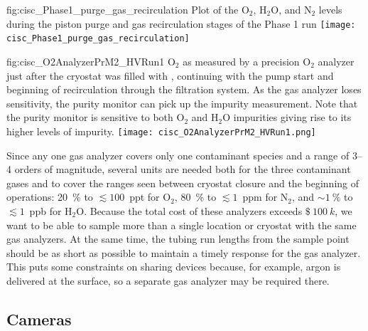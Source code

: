 \begin{dunefigure}{fig:cisc_Phase1_purge_gas_recirculation}
  {Plot of the $\text{O}_2$, $\text{H}_2\text{O}$, and $\text{N}_2$ levels during the piston purge and gas recirculation stages of the  Phase 1 run}
  \texttt{[image: cisc\_Phase1\_purge\_gas\_recirculation]}
\end{dunefigure}

\begin{dunefigure}{fig:cisc_O2AnalyzerPrM2_HVRun1}
  {$\text{O}_2$ as measured by a precision $\text{O}_2$ analyzer just after the  cryostat was filled with , continuing with the  pump start and beginning of  recirculation through the filtration system. As the gas analyzer loses sensitivity, the purity monitor can pick up the impurity measurement. Note that the purity monitor is sensitive to both $\text{O}_2$ and $\text{H}_2\text{O}$ impurities giving rise to its higher levels of impurity.}
  \texttt{[image: cisc\_O2AnalyzerPrM2\_HVRun1.png]}
\end{dunefigure}

Since any one gas analyzer covers only one contaminant species and a range of \numrange{3}{4} orders of magnitude, several units are needed both for the three contaminant gases and to cover the ranges seen between  cryostat closure and the beginning of  operations:
\SI{20}{\percent} to $\lesssim 100$~ppt for $\text{O}_2$,
\SI{80}{\percent} to $\lesssim 1$~ppm for $\text{N}_2$, and
$\sim \SI{1}{\percent}$ to $\lesssim 1$~ppb for $\text{H}_2\text{O}$.
Because the total cost of these analyzers exceeds $\SI{100}[\mathdollar]{k}$, we want to be able to  sample more than a single location or cryostat with the same gas analyzers. At the same time, the tubing run lengths from the sample point should be as short as possible to maintain a timely response for the gas analyzer.  This puts some constraints on sharing devices because, for example, argon is delivered at the surface, so a separate gas analyzer may be required there. %


\subsection{Cameras}

